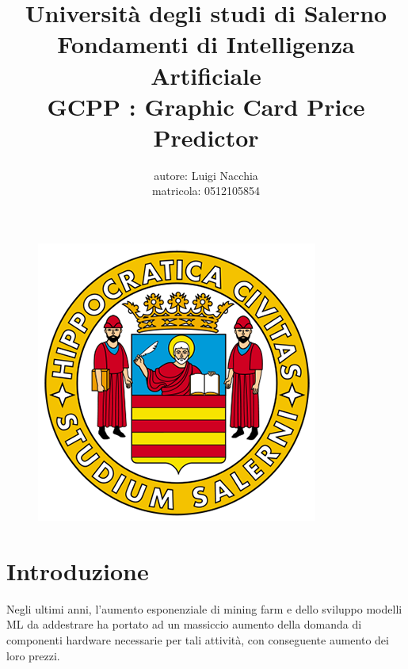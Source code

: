 \documentclass{article}
\title{Università degli studi di Salerno
        \\Fondamenti di Intelligenza Artificiale
        \\ GCPP : Graphic Card Price Predictor}
\author{autore: Luigi Nacchia\\matricola: 0512105854}
\date{}
\begin{document}
\begin{figure}
    \centering
    \includegraphics[width=0.95\linewidth]{logo_unisa.png}
\end{figure}

\maketitle

\newpage
\tableofcontents

\newpage
\section{Introduzione}
Negli ultimi anni, l'aumento esponenziale di mining farm e dello sviluppo modelli ML da addestrare ha portato ad un massiccio aumento della domanda di componenti hardware necessarie per tali attività, con conseguente aumento dei loro prezzi.
\end{document}
